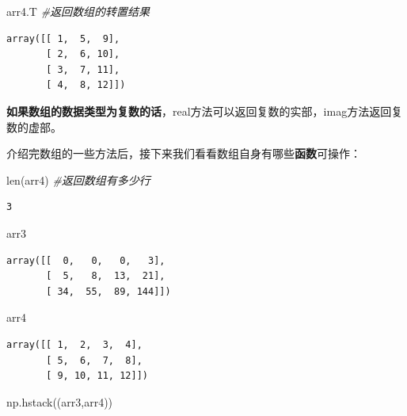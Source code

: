\documentclass[]{article}
\newenvironment{Shaded}{\begin{snugshade}}{\end{snugshade}}
\newcommand{\CommentTok}[1]{\textcolor[rgb]{0.56,0.35,0.01}{\textit{#1}}}
\newcommand{\BuiltInTok}[1]{#1}
\newcommand{\NormalTok}[1]{#1}
\begin{document}
\begin{Shaded}
\begin{Highlighting}[]
\NormalTok{arr4.T }\CommentTok{#返回数组的转置结果}
\end{Highlighting}
\end{Shaded}

\begin{verbatim}
array([[ 1,  5,  9],
       [ 2,  6, 10],
       [ 3,  7, 11],
       [ 4,  8, 12]])
\end{verbatim}

\textbf{如果数组的数据类型为复数的话}，real方法可以返回复数的实部，imag方法返回复数的虚部。

介绍完数组的一些方法后，接下来我们看看数组自身有哪些\textbf{函数}可操作：

\begin{Shaded}
\begin{Highlighting}[]
\BuiltInTok{len}\NormalTok{(arr4) }\CommentTok{#返回数组有多少行}
\end{Highlighting}
\end{Shaded}

\begin{verbatim}
3
\end{verbatim}

\begin{Shaded}
\begin{Highlighting}[]
\NormalTok{arr3}
\end{Highlighting}
\end{Shaded}

\begin{verbatim}
array([[  0,   0,   0,   3],
       [  5,   8,  13,  21],
       [ 34,  55,  89, 144]])
\end{verbatim}

\begin{Shaded}
\begin{Highlighting}[]
\NormalTok{arr4}
\end{Highlighting}
\end{Shaded}

\begin{verbatim}
array([[ 1,  2,  3,  4],
       [ 5,  6,  7,  8],
       [ 9, 10, 11, 12]])
\end{verbatim}

\begin{Shaded}
\begin{Highlighting}[]
\NormalTok{np.hstack((arr3,arr4))}
\end{Highlighting}
\end{Shaded}
\end{document}
